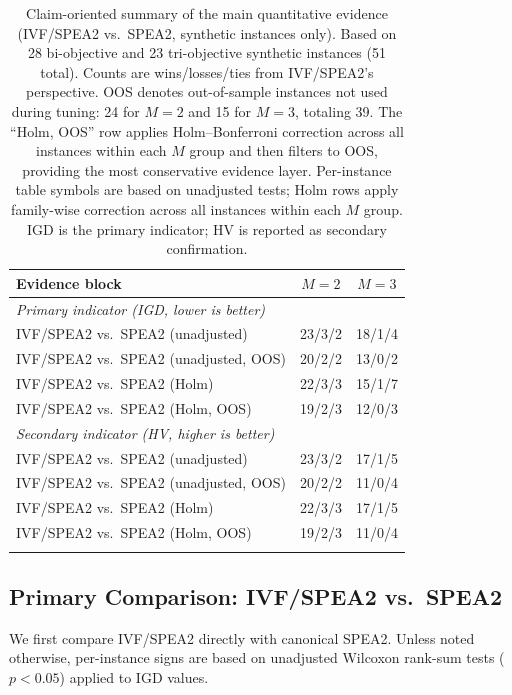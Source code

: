 \documentclass[pdflatex,sn-mathphys-ay]{sn-jnl}%
\theoremstyle{thmstyleone}%
\theoremstyle{thmstyletwo}%
\theoremstyle{thmstylethree}%
\begin{document}
\begin{table}[t]
	\caption{Claim-oriented summary of the main quantitative evidence (IVF/SPEA2 vs.\ SPEA2, synthetic instances only). Based on 28 bi-objective and 23 tri-objective synthetic instances (51 total). Counts are wins/losses/ties from IVF/SPEA2's perspective. OOS denotes out-of-sample instances not used during tuning: 24 for $M{=}2$ and 15 for $M{=}3$, totaling 39. The ``Holm, OOS'' row applies Holm--Bonferroni correction across all instances within each $M$ group and then filters to OOS, providing the most conservative evidence layer. Per-instance table symbols are based on unadjusted tests; Holm rows apply family-wise correction across all instances within each $M$ group. IGD is the primary indicator; HV is reported as secondary confirmation.}
	\label{tab:claims_summary}
	\centering
	\scriptsize
	\begin{tabular}{lcc}
		\toprule
		Evidence block                         & $M=2$  & $M=3$                 \\
		\midrule
		\multicolumn{3}{l}{\textit{Primary indicator (IGD, lower is better)}}   \\
		IVF/SPEA2 vs.\ SPEA2 (unadjusted)      & 23/3/2 & 18/1/4                \\
		IVF/SPEA2 vs.\ SPEA2 (unadjusted, OOS) & 20/2/2 & 13/0/2                \\
		IVF/SPEA2 vs.\ SPEA2 (Holm)            & 22/3/3 & 15/1/7                \\
		IVF/SPEA2 vs.\ SPEA2 (Holm, OOS)       & 19/2/3 & 12/0/3                \\
		\midrule
		\multicolumn{3}{l}{\textit{Secondary indicator (HV, higher is better)}} \\
		IVF/SPEA2 vs.\ SPEA2 (unadjusted)      & 23/3/2 & 17/1/5                \\
		IVF/SPEA2 vs.\ SPEA2 (unadjusted, OOS) & 20/2/2 & 11/0/4                \\
		IVF/SPEA2 vs.\ SPEA2 (Holm)            & 22/3/3 & 17/1/5                \\
		IVF/SPEA2 vs.\ SPEA2 (Holm, OOS)       & 19/2/3 & 11/0/4                \\
		\botrule
	\end{tabular}
\end{table}

\subsection{Primary Comparison: IVF/SPEA2 vs.\ SPEA2}\label{subsec:results-spea2}
We first compare IVF/SPEA2 directly with canonical SPEA2. Unless noted otherwise, per-instance signs are based on unadjusted Wilcoxon rank-sum tests ($p < 0.05$) applied to IGD values.
\end{document}
